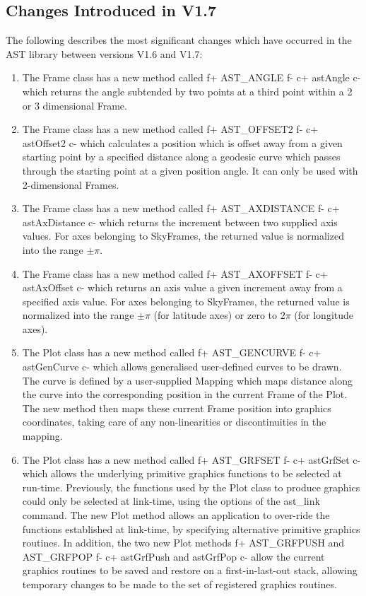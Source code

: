\documentclass[twoside,11pt]{starlink}
\begin{document}
\subsection{Changes Introduced in V1.7}

The following describes the most significant changes which have
occurred in the AST library between versions V1.6 and V1.7:

\begin{enumerate}

\item The Frame class has a new method called
f+
AST\_ANGLE
f-
c+
astAngle
c-
which returns the angle subtended by two points at a third point within a
2 or 3 dimensional Frame.

\item The Frame class has a new method called
f+
AST\_OFFSET2
f-
c+
astOffset2
c-
which calculates a position which is offset away from a given starting
point by a specified distance along a geodesic curve which passes
through the starting point at a given position angle. It can only be used
with 2-dimensional Frames.

\item The Frame class has a new method called
f+
AST\_AXDISTANCE
f-
c+
astAxDistance
c-
which returns the increment between two supplied axis values. For
axes belonging to SkyFrames, the returned value is normalized into
the range $\pm\pi$.

\item The Frame class has a new method called
f+
AST\_AXOFFSET
f-
c+
astAxOffset
c-
which returns an axis value a given increment away from a specified axis
value. For axes belonging to SkyFrames, the returned value is normalized into
the range $\pm\pi$ (for latitude axes) or zero to $2\pi$ (for longitude
axes).

\item The Plot class has a new method called
f+
AST\_GENCURVE
f-
c+
astGenCurve
c-
which allows generalised user-defined curves to be drawn. The curve is
defined by a user-supplied Mapping which maps distance along the curve
into the corresponding position in the current Frame of the Plot. The new
method then maps these current Frame position into graphics coordinates,
taking care of any non-linearities or discontinuities in the mapping.

\item The Plot class has a new method called
f+
AST\_GRFSET
f-
c+
astGrfSet
c-
which allows the underlying primitive graphics functions to be selected
at run-time. Previously, the functions used by the Plot class to produce
graphics could only be selected at link-time, using the options of the
ast\_link command. The new Plot method allows an application to over-ride
the functions established at link-time, by specifying alternative
primitive graphics routines. In addition, the two new Plot methods
f+
AST\_GRFPUSH and AST\_GRFPOP
f-
c+
astGrfPush and astGrfPop
c-
allow the current graphics routines to be saved and restore on a
first-in-last-out stack, allowing temporary changes to be made to the set
of registered graphics routines.


\end{enumerate}
\end{document}
